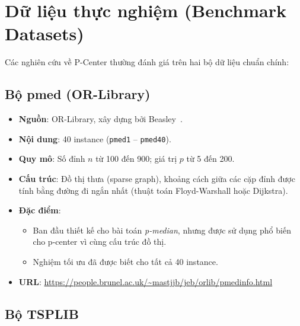 \documentclass[11pt,a4paper]{article}
\begin{document}
\section{Dữ liệu thực nghiệm (Benchmark Datasets)}
\label{sec:datasets}

Các nghiên cứu về P-Center thường đánh giá trên hai bộ dữ liệu chuẩn chính:

\subsection{Bộ pmed (OR-Library)}

\begin{itemize}[nosep]
    \item \textbf{Nguồn}: OR-Library, xây dựng bởi Beasley~\cite{beasley1990or}.
    \item \textbf{Nội dung}: 40 instance (\texttt{pmed1} -- \texttt{pmed40}).
    \item \textbf{Quy mô}: Số đỉnh $n$ từ 100 đến 900; giá trị $p$ từ 5 đến 200.
    \item \textbf{Cấu trúc}: Đồ thị thưa (sparse graph), khoảng cách giữa các cặp đỉnh được tính bằng đường đi ngắn nhất (thuật toán Floyd-Warshall hoặc Dijkstra).
    \item \textbf{Đặc điểm}:
    \begin{itemize}[nosep]
        \item Ban đầu thiết kế cho bài toán \textit{p-median}, nhưng được sử dụng phổ biến cho p-center vì cùng cấu trúc đồ thị.
        \item Nghiệm tối ưu đã được biết cho tất cả 40 instance.
    \end{itemize}
    \item \textbf{URL}: \url{https://people.brunel.ac.uk/~mastjjb/jeb/orlib/pmedinfo.html}
\end{itemize}

\subsection{Bộ TSPLIB}
\end{document}
